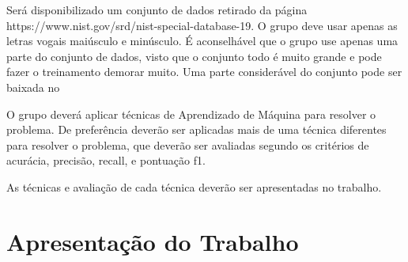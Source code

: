 \documentclass[12pt]{article}
\begin{document}
Será disponibilizado um conjunto de dados retirado da página https://www.nist.gov/srd/nist-special-database-19. O grupo deve usar apenas as letras vogais maiúsculo e minúsculo. É aconselhável que o grupo use apenas uma parte do conjunto de dados, visto que o conjunto todo é muito grande e pode fazer o treinamento demorar muito. Uma parte considerável do conjunto pode ser baixada no


O grupo deverá aplicar técnicas de Aprendizado de Máquina para resolver o problema. De preferência deverão ser aplicadas mais de uma técnica diferentes para resolver o problema, que deverão ser avaliadas segundo os critérios de acurácia, precisão, recall, e pontuação f1.


As técnicas e avaliação de cada técnica deverão ser apresentadas no trabalho.


\section{Apresentação do Trabalho}
\end{document}
